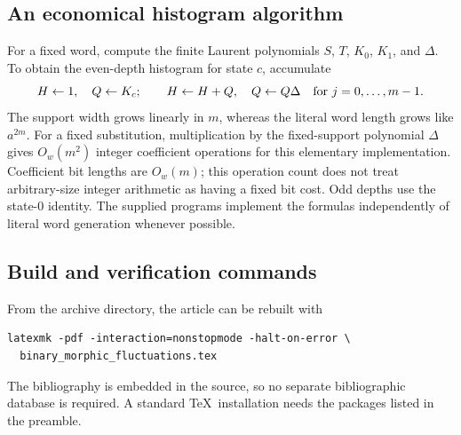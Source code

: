 \documentclass[11pt]{article}
\numberwithin{equation}{section}
\theoremstyle{definition}
\theoremstyle{remark}
\begin{document}
\subsection{An economical histogram algorithm}

For a fixed word, compute the finite Laurent polynomials $S$, $T$,
$K_0$, $K_1$, and $\Delta$. To obtain the even-depth histogram
for state $c$, accumulate
\[
 H\leftarrow1,\quad Q\leftarrow K_c;\qquad
 H\leftarrow H+Q,\quad Q\leftarrow Q\Delta
 \quad\hbox{for }j=0,\ldots,m-1 .
\]
The support width grows linearly in $m$, whereas the literal word
length grows like $a^{2m}$. For a fixed substitution, multiplication
by the fixed-support polynomial $\Delta$ gives
$O_w(m^2)$ integer coefficient operations for this elementary
implementation. Coefficient bit lengths are $O_w(m)$; this
operation count does not treat arbitrary-size integer arithmetic
as having a fixed bit cost. Odd depths use the state-$0$ identity.
The supplied programs implement the formulas independently of
literal word generation whenever possible.

\subsection{Build and verification commands}

From the archive directory, the article can be rebuilt with
\begin{verbatim}
latexmk -pdf -interaction=nonstopmode -halt-on-error \
  binary_morphic_fluctuations.tex
\end{verbatim}
The bibliography is embedded in the source, so no separate
bibliographic database is required. A standard \TeX\ installation
needs the packages listed in the preamble.
\end{document}
